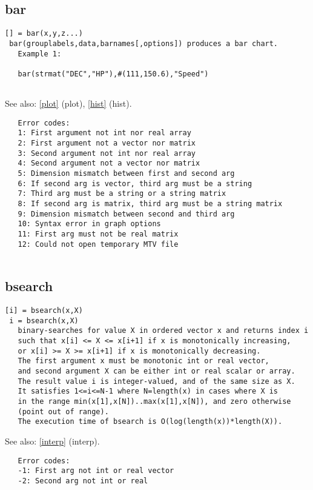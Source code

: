 \documentclass[a4paper]{article}
\begin{document}
\subsection{bar\label{bar}}

\begin{tscreen}
\begin{verbatim}
[] = bar(x,y,z...)
 bar(grouplabels,data,barnames[,options]) produces a bar chart.
   Example 1:
   
   bar(strmat("DEC","HP"),#(111,150.6),"Speed")
   
\end{verbatim}

See also: \ref{plot} {(plot)}, \ref{hist} {(hist)}.
\begin{verbatim}
   Error codes:
   1: First argument not int nor real array
   2: First argument not a vector nor matrix
   3: Second argument not int nor real array
   4: Second argument not a vector nor matrix
   5: Dimension mismatch between first and second arg
   6: If second arg is vector, third arg must be a string
   7: Third arg must be a string or a string matrix
   8: If second arg is matrix, third arg must be a string matrix
   9: Dimension mismatch between second and third arg
   10: Syntax error in graph options
   11: First arg must not be real matrix
   12: Could not open temporary MTV file
   
\end{verbatim}
\end{tscreen}





\subsection{bsearch\label{bsearch}}

\begin{tscreen}
\begin{verbatim}
[i] = bsearch(x,X)
 i = bsearch(x,X)
   binary-searches for value X in ordered vector x and returns index i
   such that x[i] <= X <= x[i+1] if x is monotonically increasing,
   or x[i] >= X >= x[i+1] if x is monotonically decreasing.
   The first argument x must be monotonic int or real vector,
   and second argument X can be either int or real scalar or array.
   The result value i is integer-valued, and of the same size as X.
   It satisfies 1<=i<=N-1 where N=length(x) in cases where X is
   in the range min(x[1],x[N])..max(x[1],x[N]), and zero otherwise
   (point out of range).
   The execution time of bsearch is O(log(length(x))*length(X)).
\end{verbatim}

See also: \ref{interp} {(interp)}.
\begin{verbatim}
   Error codes:
   -1: First arg not int or real vector
   -2: Second arg not int or real
\end{verbatim}
\end{tscreen}
\end{document}

